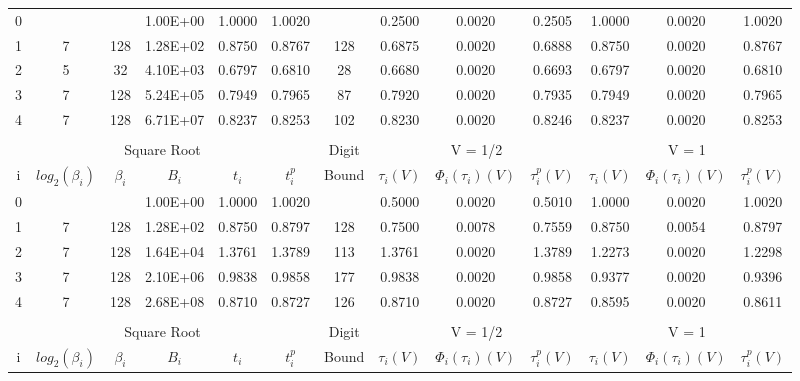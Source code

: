 \documentclass[10pt]{article}
\theoremstyle{definition}
\theoremstyle{remark}
\numberwithin{equation}{section}
\begin{document}
\begin{sidewaystable}
\begin{tabular}{ccccccccccccc}
		\hline
		0     &       &       & 1.00E+00 & 1.0000 & 1.0020 &       & 0.2500 & 0.0020 & 0.2505 & 1.0000 & 0.0020 & 1.0020 \\
		1     & 7     & 128   & 1.28E+02 & 0.8750 & 0.8767 & 128   & 0.6875 & 0.0020 & 0.6888 & 0.8750 & 0.0020 & 0.8767 \\
		2     & 5     & 32    & 4.10E+03 & 0.6797 & 0.6810 & 28    & 0.6680 & 0.0020 & 0.6693 & 0.6797 & 0.0020 & 0.6810 \\
		3     & 7     & 128   & 5.24E+05 & 0.7949 & 0.7965 & 87    & 0.7920 & 0.0020 & 0.7935 & 0.7949 & 0.0020 & 0.7965 \\
		4     & 7     & 128   & 6.71E+07 & 0.8237 & 0.8253 & 102   & 0.8230 & 0.0020 & 0.8246 & 0.8237 & 0.0020 & 0.8253 \\
		&       &       &       &       &       &       &       &       &       &       &       &  \\
		\hline
		\multicolumn{6}{|c}{Square Root}              & \multicolumn{1}{c|}{Digit} & \multicolumn{3}{c|}{V = 1/2} & \multicolumn{3}{c|}{V = 1} \\
		\multicolumn{1}{|c}{i} & $log_2(\beta_i)$ & $\beta_i$ & $B_i$ & $t_i$ & $t^p_i$ & \multicolumn{1}{c|}{Bound} & $\tau_i(V)$ & $\Phi_i(\tau_i)(V)$ & \multicolumn{1}{c|}{$\tau_i^p(V)$} & $\tau_i(V)$ & $\Phi_i(\tau_i)(V)$ & \multicolumn{1}{c|}{$\tau_i^p(V)$} \\
		\hline
		0     &       &       & 1.00E+00 & 1.0000 & 1.0020 &       & 0.5000 & 0.0020 & 0.5010 & 1.0000 & 0.0020 & 1.0020 \\
		1     & 7     & 128   & 1.28E+02 & 0.8750 & 0.8797 & 128   & 0.7500 & 0.0078 & 0.7559 & 0.8750 & 0.0054 & 0.8797 \\
		2     & 7     & 128   & 1.64E+04 & 1.3761 & 1.3789 & 113   & 1.3761 & 0.0020 & 1.3789 & 1.2273 & 0.0020 & 1.2298 \\
		3     & 7     & 128   & 2.10E+06 & 0.9838 & 0.9858 & 177   & 0.9838 & 0.0020 & 0.9858 & 0.9377 & 0.0020 & 0.9396 \\
		4     & 7     & 128   & 2.68E+08 & 0.8710 & 0.8727 & 126   & 0.8710 & 0.0020 & 0.8727 & 0.8595 & 0.0020 & 0.8611 \\
		&       &       &       &       &       &       & & & & & & \\
		\hline
		\multicolumn{6}{|c}{Square Root}              & \multicolumn{1}{c|}{Digit} & \multicolumn{3}{c|}{V = 1/2} & \multicolumn{3}{c|}{V = 1} \\
		\multicolumn{1}{|c}{i} & $log_2(\beta_i)$ & $\beta_i$ & $B_i$ & $t_i$ & $t^p_i$ & \multicolumn{1}{c|}{Bound} & $\tau_i(V)$ & $\Phi_i(\tau_i)(V)$ & \multicolumn{1}{c|}{$\tau_i^p(V)$} & $\tau_i(V)$ & $\Phi_i(\tau_i)(V)$ & \multicolumn{1}{c|}{$\tau_i^p(V)$} \\

\end{tabular}
\end{sidewaystable}
\end{document}

